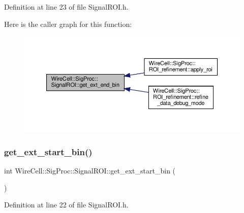 Definition at line 23 of file Signal\+R\+O\+I.\+h.

Here is the caller graph for this function\+:
\nopagebreak
\begin{figure}[H]
\begin{center}
\leavevmode
\includegraphics[width=350pt]{class_wire_cell_1_1_sig_proc_1_1_signal_r_o_i_a5d660871a8da8908e8ee1e1ed99a7ce7_icgraph}
\end{center}
\end{figure}
\mbox{\label{class_wire_cell_1_1_sig_proc_1_1_signal_r_o_i_ab7e97b198f41b189dc24556c6c0ccd52}} 
\subsubsection{\texorpdfstring{get\+\_\+ext\+\_\+start\+\_\+bin()}{get\_ext\_start\_bin()}}
{\footnotesize\ttfamily int Wire\+Cell\+::\+Sig\+Proc\+::\+Signal\+R\+O\+I\+::get\+\_\+ext\+\_\+start\+\_\+bin (\begin{DoxyParamCaption}{ }\end{DoxyParamCaption})\hspace{0.3cm}{\ttfamily [inline]}}



Definition at line 22 of file Signal\+R\+O\+I.\+h.

